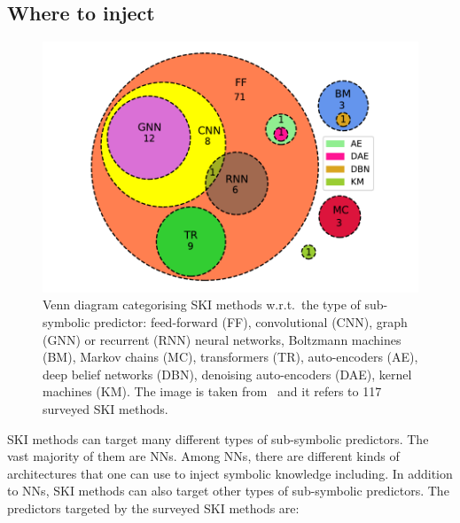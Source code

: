 \subsection{Where to inject}\label{subsec:where-to-inject}
%
\begin{figure}
    \centering
    \includegraphics[width=.6\linewidth]{figures/ski-predictors}
    \caption[Venn diagram categorising SKI methods w.r.t. the type of sub-symbolic predictor]{
        Venn diagram categorising \gls{SKI} methods w.r.t.\ the type of sub-symbolic predictor: feed-forward (FF), convolutional (CNN), graph (GNN) or recurrent (RNN) neural networks, Boltzmann machines (BM), Markov chains (MC), transformers (TR), auto-encoders (AE), deep belief networks (DBN), denoising auto-encoders (DAE), kernel machines (KM).
        The image is taken from~\cite{DBLP:journals/csur/CiattoSAMO24} and it refers to 117 surveyed \gls{SKI} methods.
    }
    \label{fig:pie-ski-predictors}
\end{figure}
%
\Gls{SKI} methods can target many different types of sub-symbolic predictors.
%
The vast majority of them are \glspl{NN}.
%
Among \glspl{NN}, there are different kinds of architectures that one can use to inject symbolic knowledge including.
%
In addition to \glspl{NN}, \gls{SKI} methods can also target other types of sub-symbolic predictors.
%
The predictors targeted by the surveyed \gls{SKI} methods are:
%
